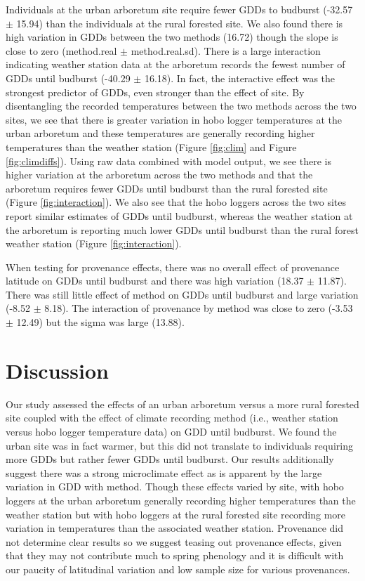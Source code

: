 \documentclass{article}\usepackage[]{graphicx}\usepackage[]{color}
\begin{document}
Individuals at the urban arboretum site require fewer GDDs to budburst (-32.57 $\pm$ 15.94) than the individuals at the rural forested site. We also found there is high variation in GDDs between the two methods (16.72) though the slope is close to zero (method.real $\pm$ method.real.sd). There is a large interaction indicating weather station data at the arboretum records the fewest number of GDDs until budburst (-40.29 $\pm$ 16.18). In fact, the interactive effect was the strongest predictor of GDDs, even stronger than the effect of site. By disentangling the recorded temperatures between the two methods across the two sites, we see that there is greater variation in hobo logger temperatures at the urban arboretum and these temperatures are generally recording higher temperatures than the weather station (Figure \ref{fig:clim} and Figure \ref{fig:climdiffs}). Using raw data combined with model output, we see there is higher variation at the arboretum across the two methods and that the arboretum requires fewer GDDs until budburst than the rural forested site (Figure \ref{fig:interaction}). We also see that the hobo loggers across the two sites report similar estimates of GDDs until budburst, whereas the weather station at the arboretum is reporting much lower GDDs until budburst than the rural forest weather station (Figure \ref{fig:interaction}). 

When testing for provenance effects, there was no overall effect of provenance latitude on GDDs until budburst and there was high variation (18.37 $\pm$ 11.87). There was still little effect of method on GDDs until budburst and large variation (-8.52 $\pm$ 8.18). The interaction of provenance by method was close to zero (-3.53 $\pm$ 12.49) but the sigma was large (13.88).

\section*{Discussion} 

Our study assessed the effects of an urban arboretum versus a more rural forested site coupled with the effect of climate recording method (i.e., weather station versus hobo logger temperature data) on GDD until budburst. We found the urban site was in fact warmer, but this did not translate to individuals requiring more GDDs but rather fewer GDDs until budburst. Our results additionally suggest there was a strong microclimate effect as is apparent by the large variation in GDD with method. Though these effects varied by site, with hobo loggers at the urban arboretum generally recording higher temperatures than the weather station but with hobo loggers at the rural forested site recording more variation in temperatures than the associated weather station. Provenance did not determine clear results so we suggest teasing out provenance effects, given that they may not contribute much to spring phenology \citep{Gauzere2017} and it is difficult with our paucity of latitudinal variation and low sample size for various provenances. 
\end{document}
